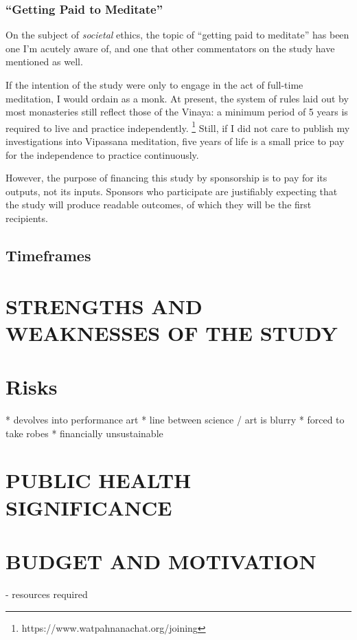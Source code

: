 \documentclass[a4paper, amsfonts, amssymb, amsmath, reprint, showkeys, nofootinbib, twoside]{revtex4-1}
\begin{document}
\subsubsection{``Getting Paid to Meditate''}

On the subject of \textit{societal} ethics, the topic of
``getting paid to meditate'' has been one I'm acutely aware of, and one
that other commentators on the study have mentioned as well.

If the intention of the study were only to engage in the act of full-time
meditation, I would ordain as a monk.
At present, the system of rules laid out by most monasteries still reflect
those of the Vinaya: a minimum period of 5 years is required to live and
practice independently.
\footnote{https://www.watpahnanachat.org/joining}
Still, if I did not care to publish my investigations into Vipassana
meditation, five years of life is a small price to pay for the
independence to practice continuously.
\cite{nanatusita2014patimokkha}

However, the purpose of financing this study by sponsorship is to pay for
its outputs, not its inputs.
Sponsors who participate are justifiably expecting that the study will
produce readable outcomes, of which they will be the first recipients.

\subsection{Timeframes}

\section{STRENGTHS AND WEAKNESSES OF THE STUDY}

\section{Risks}

* devolves into performance art
* line between science / art is blurry
* forced to take robes
* financially unsustainable

\section{PUBLIC HEALTH SIGNIFICANCE}
\section{BUDGET AND MOTIVATION}
- resources required
\end{document}
